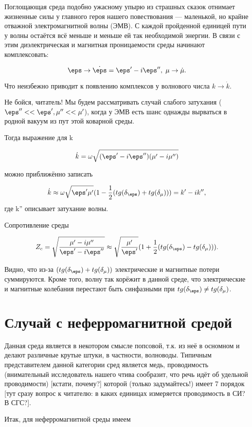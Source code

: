 Поглощающая среда подобно ужасному упырю из страшных сказок отнимает жизненные силы у главного героя
нашего повествования --- маленькой, но 
крайне отважной электромагнитной волны (ЭМВ). С каждой пройденной единицей пути у волны остаётся всё меньше и меньше
ей так необходимой энергии. В связи с этим диэлектрическая и магнитная проницаемости среды начинают комплексовать:

$$\eps \to \dot{\eps} = \eps'-i\eps'', \; \mu \to \dot{\mu}. $$

Что неизбежно приводит к появлению комплексов у волнового числа $k \to \dot{k}$.


Не бойся, читатель! Мы будем рассматривать случай слабого затухания ($\eps''<<\eps', \mu''<< \mu'$), когда 
 у ЭМВ есть шанс однажды вырваться в родной вакуум из пут этой коварной среды.


Тогда выражение для k 

$$\dot{k}=\omega \sqrt{(\eps'-i\eps'')(\mu'-i\mu'')} $$

можно приближённо записать

$$\dot{k} \approx \omega \sqrt{\eps'\mu'}(1-\frac{1}{2}(tg(\delta_{\eps})+tg(\delta_{\mu})))=k'-ik'', $$
где k'' описывает затухание волны.

Сопротивление среды 

$$Z_c=\sqrt{\frac{\mu'-i\mu''}{\eps'-i\eps''}} 
\approx \sqrt{\frac{\mu'}{\eps'}}(1+\frac{1}{2}(tg(\delta_{\eps})-tg(\delta_{\mu}))). $$

Видно, что из-за $(tg(\delta_{\eps})+tg(\delta_{\mu}))$ электрические и магнитные
потери суммируются. Кроме того, волну так корёжит в данной среде, что электрические и магнитные колебания
перестают быть синфазными при $tg(\delta_{\eps}) \ne tg(\delta_{\mu})$.

\section{Случай с неферромагнитной средой}

Данная среда является в некотором смысле попсовой, т.к. из неё в осномном и делают различные 
крутые штуки, в частности, волноводы. Типичным представителем данной категории сред является медь, 
проводимость (внимательный исследователь нашего чтива сообразит, что речь идёт об удельной проводимости)
[кстати, почему?] которой (только задумайтесь!) имеет 7 порядок [тут сразу вопрос к читателю:
в каких единицах измеряется проводимость в СИ? В СГС?].


Итак, для неферромагнитной среды имеем

